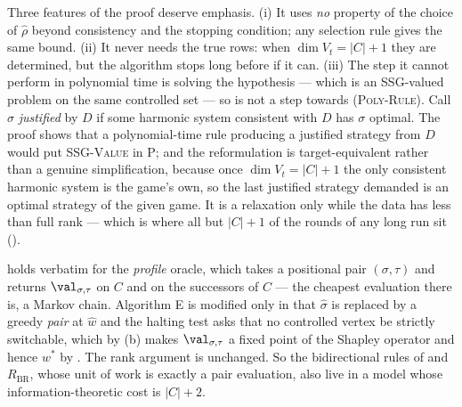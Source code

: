 \begin{remark}\label{rem:qm-eval}
Three features of the proof deserve emphasis.  (i) It uses \emph{no}
property of the choice of $\hat\rho$ beyond consistency and the stopping
condition; any selection rule gives the same bound.  (ii) It never needs
the true rows: when $\dim V_t=|C|+1$ they are determined, but the algorithm
stops long before if it can.  (iii) The step it cannot perform in
polynomial time is solving the hypothesis --- which is an SSG-valued
problem on the same controlled set --- so  is not a step
towards \textsc{(Poly-Rule)}.  Call $\sigma$ \emph{justified} by $D$ if some harmonic system
consistent with $D$ has $\sigma$ optimal.  The proof shows that a
polynomial-time rule producing a justified strategy from $D$ would put
\textsc{SSG-Value} in \textsf{P}; and the reformulation is
target-equivalent rather than a genuine simplification, because once
$\dim V_t=|C|+1$ the only consistent harmonic system is the game's own,
so the last justified strategy demanded is an optimal strategy of the
given game.  It is a relaxation only while the data has less than full
rank --- which is where all but $|C|+1$ of the rounds of any long run
sit ().
\end{remark}

\begin{remark}\label{rem:qm-profile}
 holds verbatim for the \emph{profile} oracle, which
takes a positional pair $(\sigma,\tau)$ and returns $\val_{\sigma,\tau}$ on
$C$ and on the successors of $C$ --- the cheapest evaluation there is, a
Markov chain.  Algorithm E is modified only in that $\hat\sigma$ is
replaced by a greedy \emph{pair} at $\hat w$ and the halting test asks that
no controlled vertex be strictly switchable, which by (b)
makes $\val_{\sigma,\tau}$ a fixed point of the Shapley operator and hence
$w^\ast$ by .  The rank argument is unchanged.  So
the bidirectional rules of  and $R_{\mathrm{BR}}$, whose unit
of work is exactly a pair evaluation, also live in a model whose
information-theoretic cost is $|C|+2$.
\end{remark}

